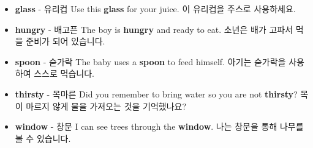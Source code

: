 \documentclass{article}
\begin{document}
\begin{addmargin}[1em]{1em}
\begin{itemize}
        \item \fontsize{12pt}{14pt}\selectfont \textbf{glass} - 유리컵 \newline
        Use this \textbf{glass} for your juice. \newline
        이 유리컵을 주스로 사용하세요.
        
        \item \fontsize{12pt}{14pt}\selectfont \textbf{hungry} - 배고픈 \newline
        The boy is \textbf{hungry} and ready to eat. \newline
        소년은 배가 고파서 먹을 준비가 되어 있습니다.
        
        \item \fontsize{12pt}{14pt}\selectfont \textbf{spoon} - 숟가락 \newline
        The baby uses a \textbf{spoon} to feed himself. \newline
        아기는 숟가락을 사용하여 스스로 먹습니다.
        
        \item \fontsize{12pt}{14pt}\selectfont \textbf{thirsty} - 목마른 \newline
        Did you remember to bring water so you are not \textbf{thirsty}? \newline
        목이 마르지 않게 물을 가져오는 것을 기억했나요?
        
        \item \fontsize{12pt}{14pt}\selectfont \textbf{window} - 창문 \newline
        I can see trees through the \textbf{window}. \newline
        나는 창문을 통해 나무를 볼 수 있습니다.
    \end{itemize}
\end{addmargin}
\end{document}
